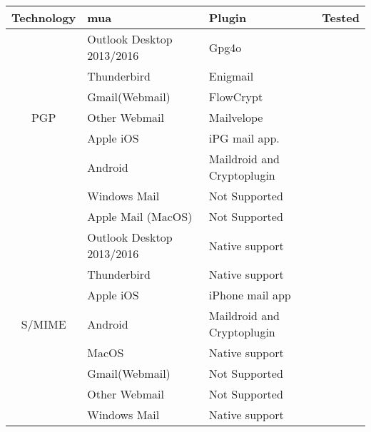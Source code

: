 {\def\arraystretch{1.2}\tabcolsep=3pt
\begin{table*}%
	\scriptsize
	\centering
	\begin{tabular}{|c|l|l|c|}
		\hline
		\textbf{Technology}		& \textbf{\acrlong{mua}}   		& \textbf{Plugin}  				& \textbf{Tested}	\\ \hline
								& Outlook Desktop 2013/2016		& Gpg4o							& \cmark	\\ \cline{2-4}
								& Thunderbird					& Enigmail 						& \cmark 	\\ \cline{2-4}
								& Gmail(Webmail)				& FlowCrypt						& \cmark	\\ \cline{2-4}
		{PGP}					& Other Webmail  				& Mailvelope            		& \cmark	\\ \cline{2-4}
								& Apple iOS						& iPG mail app.         		& \xmark	\\ \cline{2-4}
								& Android						& Maildroid and Cryptoplugin	& \cmark	\\ \cline{2-4}
		     					& Windows Mail 					& Not Supported					& \xmark	\\ \cline{2-4}
		     					& Apple Mail (MacOS)			& Not Supported					& \xmark 	\\ \hline
		     					
								& Outlook Desktop 2013/2016		& Native support				& \cmark	\\ \cline{2-4}
								& Thunderbird					& Native support 				& \cmark 	\\ \cline{2-4}
								& Apple iOS						& iPhone mail app				& \cmark	\\ \cline{2-4}
		{S/MIME}				& Android						& Maildroid and Cryptoplugin    & \cmark	\\ \cline{2-4}
								& MacOS							& Native support         		& \cmark	\\ \cline{2-4}
								& Gmail(Webmail)				& Not Supported 				& \xmark	\\ \cline{2-4}
								& Other Webmail 				& Not Supported					& \xmark	\\ \cline{2-4}
								& Windows Mail					& Native support				& \xmark 	\\ \hline
								

\end{tabular}
\end{table*}}
